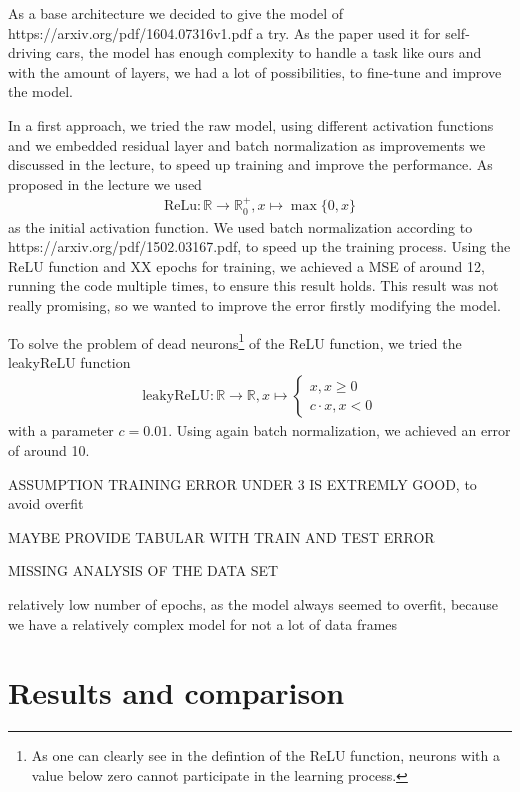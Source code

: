 \documentclass[conference]{IEEEtran}
\begin{document}
As a base architecture we decided to give the model of https://arxiv.org/pdf/1604.07316v1.pdf a try. As the paper used it
for self-driving cars, the model has enough complexity to handle a task like ours and with the amount of layers, we had a lot of
possibilities, to fine-tune and improve the model.

In a first approach, we tried the raw model, using different activation functions and we embedded residual layer and batch 
normalization as improvements we discussed in the lecture, to speed up training and improve the performance. As proposed in the lecture
we used
\begin{align*}
\mathrm{ReLu}: \mathbb{R} \to \mathbb{R}_0^+, x \mapsto \max\{0,x\}
\end{align*}
as the initial activation function. We used batch normalization according to https://arxiv.org/pdf/1502.03167.pdf, to speed up the 
training process. Using the ReLU function and XX epochs for training, we achieved a MSE of around 12, running the code multiple times, to ensure this result holds. This result was not really promising, so we wanted to improve the error firstly modifying the model.

To solve the problem of dead neurons\footnote{As one can clearly see in the defintion of the ReLU 
function, neurons with a value below zero cannot participate in the learning process.} of the ReLU function, we 
tried the leakyReLU function
\begin{align*}
\mathrm{leakyReLU} : \mathbb{R} \to \mathbb{R}, x \mapsto \begin{cases}
x, x \geq 0\\
c \cdot x, x <0
\end{cases}
\end{align*}
with a parameter $c = 0.01$. Using again batch normalization, we achieved an error of around 10.

ASSUMPTION TRAINING ERROR UNDER 3 IS EXTREMLY GOOD, to avoid overfit

MAYBE PROVIDE TABULAR WITH TRAIN AND TEST ERROR

MISSING ANALYSIS OF THE DATA SET

relatively low number of epochs, as the model always seemed to overfit, because we have a relatively complex model for not a lot of
data frames



\section{Results and comparison}
\end{document}
